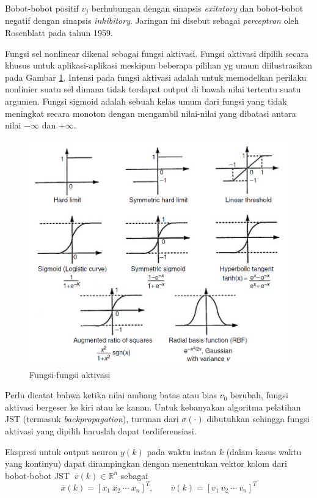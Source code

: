 Bobot-bobot positif  $v_j$ berhubungan dengan sinapsis \textit{exitatory} dan bobot-bobot negatif dengan sinapsis \textit{inhibitory}. Jaringan ini disebut sebagai \textit{perceptron} oleh Rosenblatt pada tahun 1959.

Fungsi sel nonlinear dikenal sebagai fungsi aktivasi. Fungsi aktivasi dipilih secara khusus untuk aplikasi-aplikasi meskipun beberapa pilihan yg umum diilustrasikan pada Gambar \ref{fig:3:activation}. Intensi pada fungsi aktivasi adalah untuk memodelkan perilaku nonlinier suatu sel dimana tidak terdapat output di bawah nilai tertentu suatu argumen. Fungsi sigmoid adalah sebuah kelas umum dari fungsi yang tidak meningkat secara monoton dengan mengambil nilai-nilai yang dibatasi antara nilai $-\infty$ dan $+\infty$. 
\begin{figure}[!h]
	\centering
	\includegraphics[width=1\textwidth]{figures/activationFunction}
	\caption{Fungsi-fungsi aktivasi \cite{NNControlBook}}
	\label{fig:3:activation}
\end{figure}
Perlu dicatat bahwa ketika nilai ambang batas atau bias $v_0$ berubah, fungsi aktivasi bergeser ke kiri atau ke kanan. Untuk kebanyakan algoritma pelatihan JST (termasuk \textit{backpropagation}), turunan dari $\sigma(\cdot)$ dibutuhkan sehingga fungsi aktivasi yang dipilih haruslah dapat terdiferensiasi.\cite{NNControlBook}

Ekspresi untuk output neuron $y(k)$ pada waktu instan $k$ (dalam kasus waktu yang kontinyu) dapat dirampingkan dengan menentukan vektor kolom dari bobot-bobot JST $\ \overline{v}(k) \in \mathbb{R}^n $ sebagai
\vspace{-1em}
\begin{equation} \label{eq:3:vektorKolom}
\overline{x}(k) = [x_1\ x_2\ \cdots\ x_n]^T, \qquad \overline{v}(k) = [v_1\ v_2\ \cdots\ v_n]^T
\end{equation}

